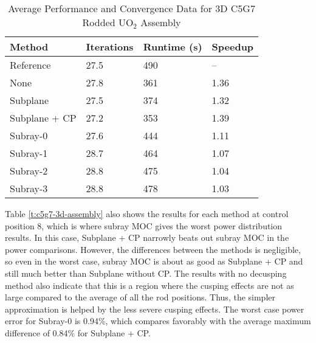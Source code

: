 \begin{table}[h]
\centering
\caption[3D C5G7 UO$_2$ Assembly Performance]{Average Performance and Convergence Data for 3D C5G7 Rodded UO$_2$ Assembly}\label{t:subray-performance-3Dassembly}
\begin{tabular}{l l l l}\toprule
    Method & Iterations & Runtime (s) & Speedup \\\midrule
    Reference     & 27.5 & 490 & --   \\
    None          & 27.8 & 361 & 1.36 \\
    Subplane      & 27.5 & 374 & 1.32 \\
    Subplane + CP & 27.2 & 353 & 1.39 \\
    Subray-0      & 27.6 & 444 & 1.11 \\
    Subray-1      & 28.7 & 464 & 1.07 \\
    Subray-2      & 28.8 & 475 & 1.04 \\
    Subray-3      & 28.8 & 478 & 1.03 \\
    \bottomrule
\end{tabular}
\end{table}

Table \ref{t:c5g7-3d-assembly} also shows the results for each method at control position 8, which is where subray MOC gives the worst power distribution results.  In this case, Subplane + CP narrowly beats out subray MOC in the power comparisons.  However, the differences between the methods is negligible, so even in the worst case, subray MOC is about as good as Subplane + CP and still much better than Subplane without CP.  The results with no decusping method also indicate that this is a region where the cusping effects are not as large compared to the average of all the rod positions.  Thus, the simpler approximation is helped by the less severe cusping effects.  The worst case power error for Subray-0 is 0.94\%, which compares favorably with the average maximum difference of 0.84\% for Subplane + CP.

